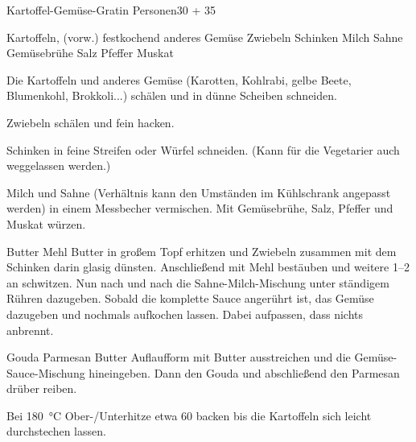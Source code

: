 \begin{MyRecipe}{Kartoffel-Gemüse-Gratin}{ Personen}{\SI{30}{\minuteprime} + \SI{35}{\minuteprime}}

	\ingredient[\Calc{0.5}{\x}]{\si{\kilogram}} {Kartoffeln, (vorw.) festkochend}
	\ingredient[\Calc{0.5}{\x}]{\si{\kilogram}} {anderes Gemüse}
	\ingredient[\Calc{1}{\x}]{} {Zwiebeln}
	\ingredient[\Calc{0.15}{\x}]{\si{\kilogram}} {Schinken}	\ingredient[\Calc{0.25}{\x}]{\si{\liter}} {Milch}
	\ingredient[\Calc{0.25}{\x}]{\si{\liter}} {Sahne}
	 {Gemüsebrühe}
	 {Salz}
	 {Pfeffer}
	 {Muskat}
	
	Die Kartoffeln und anderes Gemüse (Karotten, Kohlrabi, gelbe Beete, Blumenkohl, Brokkoli...) schälen und in dünne Scheiben schneiden.
	
	Zwiebeln schälen und fein hacken.
	
	Schinken in feine Streifen oder Würfel schneiden. (Kann für die Vegetarier auch weggelassen werden.)
	
	Milch und Sahne (Verhältnis kann den Umständen im Kühlschrank angepasst werden) in einem Messbecher vermischen. Mit Gemüsebrühe, Salz, Pfeffer und Muskat würzen.\par\bigskip
	

	\ingredient[\Calc{50}{\x}]{\si{\gram}} {Butter}
	 {Mehl}
	Butter in großem Topf erhitzen und Zwiebeln zusammen mit dem Schinken darin glasig dünsten. Anschließend mit Mehl bestäuben und weitere \SIrange{1}{2}{\minuteprime} an schwitzen. Nun nach und nach die Sahne-Milch-Mischung unter ständigem Rühren dazugeben. Sobald die komplette Sauce angerührt ist, das Gemüse dazugeben und nochmals aufkochen lassen. Dabei aufpassen, dass nichts anbrennt.\par\bigskip
	
	\ingredient[\Calc{0.2}{\x}]{\si{\kilogram}} {Gouda}
	\ingredient[\Calc{0.1}{\x}]{\si{\kilogram}} {Parmesan}
	 {Butter}	
	Auflaufform mit Butter ausstreichen und die Gemüse-Sauce-Mischung hineingeben. Dann den Gouda und abschließend den Parmesan drüber reiben.\par\bigskip
	
	Bei \SI{180}{\degreeCelsius} Ober-/Unterhitze etwa \SI{60}{\minuteprime} backen bis die Kartoffeln sich leicht durchstechen lassen.
		
\end{MyRecipe}